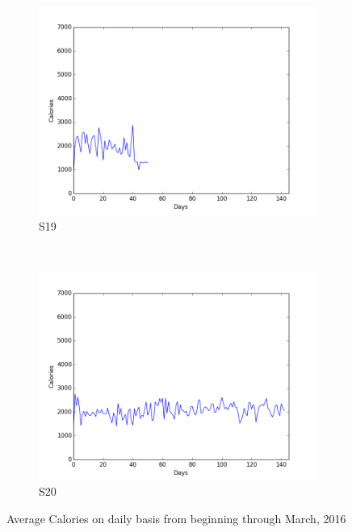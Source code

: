 \documentclass[12pt]{article} %
\begin{document}
\begin{figure}[H]
    \begin{subfigure}[b]{0.2\textwidth}
        \includegraphics[width=\textwidth]{img/graphs/19-calories-1}
        \caption{S19}
        \label{fig:s19cal}
    \end{subfigure}
    ~ %
    \begin{subfigure}[b]{0.2\textwidth}
        \includegraphics[width=\textwidth]{img/graphs/20-calories-1}
        \caption{S20}
        \label{fig:s20cal}
    \end{subfigure}
    \caption{Average Calories on daily basis from beginning through March, 2016}
    \label{fig:avgCal}
\end{figure}
\end{document}
